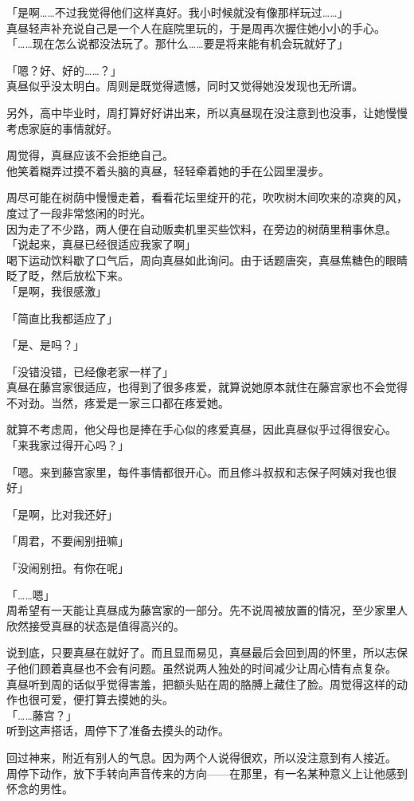 「是啊……不过我觉得他们这样真好。我小时候就没有像那样玩过……」\\

真昼轻声补充说自己是一个人在庭院里玩的，于是周再次握住她小小的手心。\\

「……现在怎么说都没法玩了。那什么……要是将来能有机会玩就好了」

「嗯？好、好的……？」\\

真昼似乎没太明白。周则是既觉得遗憾，同时又觉得她没发现也无所谓。

另外，高中毕业时，周打算好好讲出来，所以真昼现在没注意到也没事，让她慢慢考虑家庭的事情就好。

周觉得，真昼应该不会拒绝自己。\\

他笑着糊弄过摸不着头脑的真昼，轻轻牵着她的手在公园里漫步。

周尽可能在树荫中慢慢走着，看看花坛里绽开的花，吹吹树木间吹来的凉爽的风，度过了一段非常悠闲的时光。\\

因为走了不少路，两人便在自动贩卖机里买些饮料，在旁边的树荫里稍事休息。\\

「说起来，真昼已经很适应我家了啊」\\

喝下运动饮料歇了口气后，周向真昼如此询问。由于话题唐突，真昼焦糖色的眼睛眨了眨，然后放松下来。\\

「是啊，我很感激」

「简直比我都适应了」

「是、是吗？」

「没错没错，已经像老家一样了」\\

真昼在藤宫家很适应，也得到了很多疼爱，就算说她原本就住在藤宫家也不会觉得不对劲。当然，疼爱是一家三口都在疼爱她。

就算不考虑周，他父母也是捧在手心似的疼爱真昼，因此真昼似乎过得很安心。\\

「来我家过得开心吗？」

「嗯。来到藤宫家里，每件事情都很开心。而且修斗叔叔和志保子阿姨对我也很好」

「是啊，比对我还好」

「周君，不要闹别扭嘛」

「没闹别扭。有你在呢」

「……嗯」\\

周希望有一天能让真昼成为藤宫家的一部分。先不说周被放置的情况，至少家里人欣然接受真昼的状态是值得高兴的。

说到底，只要真昼在就好了。而且显而易见，真昼最后会回到周的怀里，所以志保子他们顾着真昼也不会有问题。虽然说两人独处的时间减少让周心情有点复杂。\\

真昼听到周的话似乎觉得害羞，把额头贴在周的胳膊上藏住了脸。周觉得这样的动作也很可爱，便打算去摸她的头。\\

「……藤宫？」\\

听到这声搭话，周停下了准备去摸头的动作。

回过神来，附近有别人的气息。因为两个人说得很欢，所以没注意到有人接近。\\

周停下动作，放下手转向声音传来的方向——在那里，有一名某种意义上让他感到怀念的男性。
